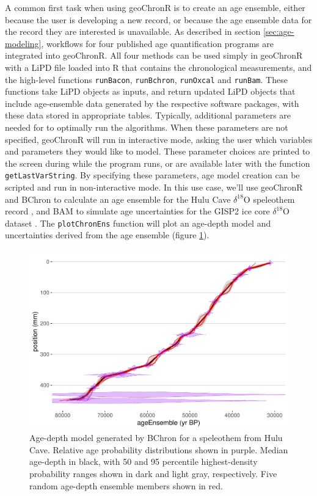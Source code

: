 \documentclass[gchron, manuscript]{copernicus}
\begin{document}
A common first task when using geoChronR is to create an age ensemble, either because the user is developing a new record, or because the age ensemble data for the record they are interested is unavailable.
As described in section \ref{sec:age-modeling}, workflows for four published age quantification programs are integrated into geoChronR.
All four methods can be used simply in geoChronR with a LiPD file loaded into R that contains the chronological measurements, and the high-level functions \texttt{runBacon}, \texttt{runBchron}, \texttt{runOxcal} and \texttt{runBam}.
These functions take LiPD objects as inputs, and return updated LiPD objects that include age-ensemble data generated by the respective software packages, with these data stored in appropriate tables.
Typically, additional parameters are needed for to optimally run the algorithms.
When these parameters are not specified, geoChronR will run in interactive mode, asking the user which variables and parameters they would like to model.
These parameter choices are printed to the screen during while the program runs, or are available later with the function \texttt{getLastVarString}.
By specifying these parameters, age model creation can be scripted and run in non-interactive mode.
In this use case, we'll use geoChronR and BChron \citep{parnell2008flexible} to calculate an age ensemble for the Hulu Cave \(\delta^{18}\)O speleothem record \citep{hulu2001}, and BAM \citep{BAM} to simulate age uncertainties for the GISP2 ice core \(\delta^{18}\)O dataset \citep{alley2000}.
The \texttt{plotChronEns} function will plot an age-depth model and uncertainties derived from the age ensemble (figure \ref{fig:age-model}).

\begin{figure}
\includegraphics[width=12cm]{geoChronR-paper_files/figure-latex/age-model-1} \caption{Age-depth model generated by BChron for a speleothem from Hulu Cave. Relative age probability distributions shown in purple. Median age-depth in black, with 50 and 95 percentile highest-density probability ranges shown in dark and light gray, respectively. Five random age-depth ensemble members shown in red.}\label{fig:age-model}
\end{figure}
\end{document}
